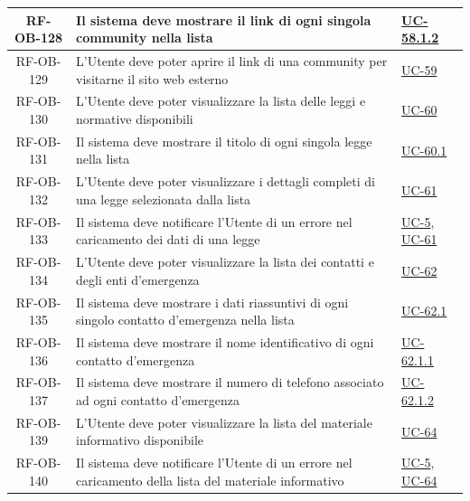 \documentclass[a4paper,12pt]{article}
\begin{document}
\begin{center}
\begin{longtable}{|c|p{8.5cm}|>{\centering\arraybackslash}p{4cm}|}
RF-OB-128 & Il sistema deve mostrare il link di ogni singola community nella lista & \hyperref[subsec:UC-58.1.2]{UC-58.1.2} \\
\hline

RF-OB-129 & L'Utente deve poter aprire il link di una community per visitarne il sito web esterno & \hyperref[sec:UC-59]{UC-59} \\
\hline

RF-OB-130 & L'Utente deve poter visualizzare la lista delle leggi e normative disponibili & \hyperref[sec:UC-60]{UC-60} \\
\hline

RF-OB-131 & Il sistema deve mostrare il titolo di ogni singola legge nella lista & \hyperref[subsec:UC-60.1]{UC-60.1} \\
\hline

RF-OB-132 & L'Utente deve poter visualizzare i dettagli completi di una legge selezionata dalla lista & \hyperref[sec:UC-61]{UC-61} \\
\hline

RF-OB-133 & Il sistema deve notificare l'Utente di un errore nel caricamento dei dati di una legge & \hyperref[sec:UC-5]{UC-5}, \hyperref[sec:UC-61]{UC-61} \\
\hline

RF-OB-134 & L'Utente deve poter visualizzare la lista dei contatti e degli enti d'emergenza & \hyperref[sec:UC-62]{UC-62} \\
\hline

RF-OB-135 & Il sistema deve mostrare i dati riassuntivi di ogni singolo contatto d'emergenza nella lista & \hyperref[subsec:UC-62.1]{UC-62.1} \\
\hline

RF-OB-136 & Il sistema deve mostrare il nome identificativo di ogni contatto d'emergenza & \hyperref[subsec:UC-62.1.1]{UC-62.1.1} \\
\hline

RF-OB-137 & Il sistema deve mostrare il numero di telefono associato ad ogni contatto d'emergenza & \hyperref[subsec:UC-62.1.2]{UC-62.1.2} \\
\hline

RF-OB-139 & L'Utente deve poter visualizzare la lista del materiale informativo disponibile & \hyperref[sec:UC-64]{UC-64} \\
\hline

RF-OB-140 & Il sistema deve notificare l'Utente di un errore nel caricamento della lista del materiale informativo & \hyperref[sec:UC-5]{UC-5}, \hyperref[sec:UC-64]{UC-64} \\
\hline


\end{longtable}
\end{center}
\end{document}
